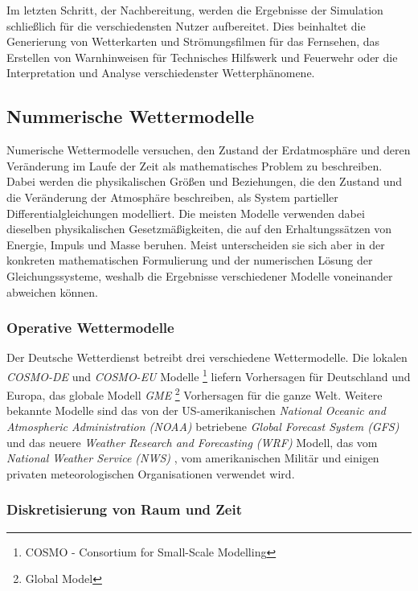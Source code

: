 Im letzten Schritt, der Nachbereitung, werden die Ergebnisse der
Simulation schließlich für die verschiedensten Nutzer
aufbereitet. Dies beinhaltet die Generierung von Wetterkarten und
Strömungsfilmen für das Fernsehen, das Erstellen von Warnhinweisen für
Technisches Hilfswerk und Feuerwehr oder die Interpretation und
Analyse verschiedenster Wetterphänomene.

\subsection{Nummerische Wettermodelle}
Numerische Wettermodelle versuchen, den Zustand der Erdatmosphäre und
deren Veränderung im Laufe der Zeit als mathematisches Problem zu
beschreiben. Dabei werden die physikalischen Größen und Beziehungen,
die den Zustand und die Veränderung der Atmosphäre beschreiben, als
System partieller Differentialgleichungen modelliert. Die meisten
Modelle verwenden dabei dieselben physikalischen Gesetzmäßigkeiten,
die auf den Erhaltungssätzen von Energie, Impuls und Masse
beruhen. Meist unterscheiden sie sich aber in der konkreten
mathematischen Formulierung und der numerischen Lösung der
Gleichungssysteme, weshalb die Ergebnisse verschiedener Modelle
voneinander abweichen können.

\subsubsection{Operative Wettermodelle}
Der Deutsche Wetterdienst betreibt drei verschiedene
Wettermodelle. Die lokalen \textit{COSMO-DE} und \textit{COSMO-EU}
Modelle \footnote{COSMO - Consortium for Small-Scale Modelling}
 liefern
Vorhersagen für Deutschland und Europa, das globale Modell
\textit{GME} \footnote{Global Model}  Vorhersagen für die ganze
Welt. Weitere bekannte Modelle sind das von der US-amerikanischen
\textit{National Oceanic and Atmospheric Administration (NOAA)}
betriebene \textit{Global Forecast System (GFS)}
 und das neuere
\textit{Weather Research and Forecasting (WRF)}
 Modell, das vom
\textit{National Weather Service (NWS)} , vom amerikanischen Militär und einigen privaten
meteorologischen Organisationen verwendet wird.

\subsubsection{Diskretisierung von Raum und Zeit}

